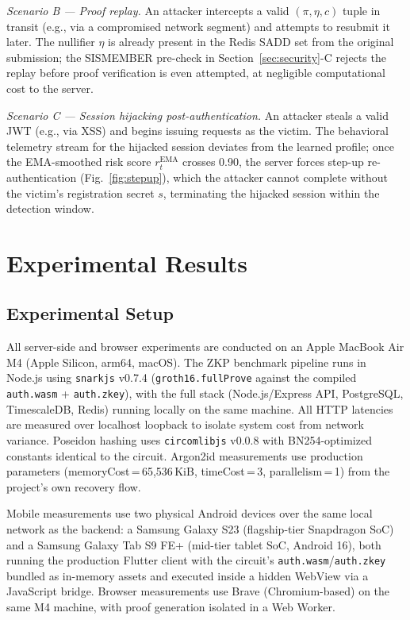 \documentclass[journal,twoside,10pt]{IEEEtran}
\begin{document}
\textit{Scenario B --- Proof replay.} An attacker intercepts a valid
$(\pi, \eta, c)$ tuple in transit (e.g., via a compromised network segment)
and attempts to resubmit it later. The nullifier $\eta$ is already present
in the Redis SADD set from the original submission; the SISMEMBER pre-check
in Section~\ref{sec:security}-C rejects the replay before proof verification
is even attempted, at negligible computational cost to the server.

\textit{Scenario C --- Session hijacking post-authentication.} An attacker
steals a valid JWT (e.g., via XSS) and begins issuing requests as the
victim. The behavioral telemetry stream for the hijacked session deviates
from the learned profile; once the EMA-smoothed risk score $r_t^{\text{EMA}}$
crosses 0.90, the server forces step-up re-authentication
(Fig.~\ref{fig:stepup}), which the attacker cannot complete without the
victim's registration secret $s$, terminating the hijacked session within
the detection window.

\section{Experimental Results}
\label{sec:results}

\subsection{Experimental Setup}

All server-side and browser experiments are conducted on an Apple MacBook
Air M4 (Apple Silicon, arm64, macOS). The ZKP benchmark pipeline runs in
Node.js using \texttt{snarkjs} v0.7.4 (\texttt{groth16.fullProve} against
the compiled \texttt{auth.wasm} + \texttt{auth.zkey}), with the full stack
(Node.js/Express API, PostgreSQL, TimescaleDB, Redis) running locally on the
same machine. All HTTP latencies are measured over localhost loopback to
isolate system cost from network variance. Poseidon hashing uses
\texttt{circomlibjs} v0.0.8 with BN254-optimized constants identical to the
circuit. Argon2id measurements use production parameters
(memoryCost\,=\,65,536\,KiB, timeCost\,=\,3, parallelism\,=\,1) from the
project's own recovery flow.

Mobile measurements use two physical Android devices over the same local
network as the backend: a Samsung Galaxy S23 (flagship-tier Snapdragon
SoC) and a Samsung Galaxy Tab S9 FE+ (mid-tier tablet SoC, Android 16),
both running the production Flutter client with the circuit's
\texttt{auth.wasm}/\texttt{auth.zkey} bundled as in-memory assets and
executed inside a hidden WebView via a JavaScript bridge. Browser
measurements use Brave (Chromium-based) on the same M4 machine, with proof
generation isolated in a Web Worker.
\end{document}
